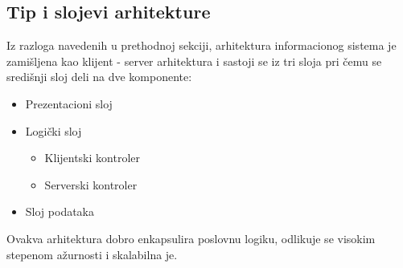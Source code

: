 \subsection{Tip i slojevi arhitekture}

Iz razloga navedenih u prethodnoj sekciji, arhitektura informacionog sistema je zamišljena kao klijent - server arhitektura i sastoji se iz tri sloja pri čemu se središnji sloj deli na dve komponente: 
\begin{itemize}
    \item Prezentacioni sloj
    \item Logički sloj
    \begin{itemize}
        \item Klijentski kontroler 
        \item Serverski kontroler
    \end{itemize}
    \item Sloj podataka
\end{itemize}
 Ovakva arhitektura dobro enkapsulira poslovnu logiku, odlikuje se visokim stepenom ažurnosti i skalabilna je.



